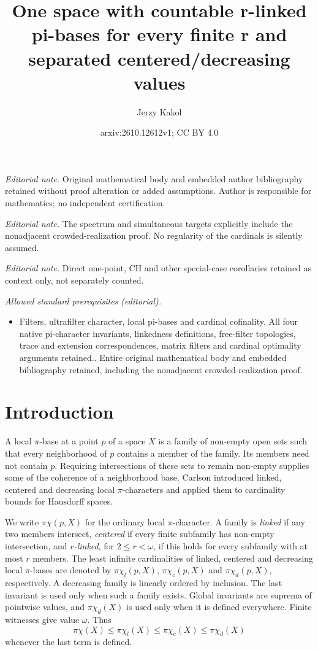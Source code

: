 \documentclass[10pt,a4paper]{amsart}
\title{One space with countable r-linked pi-bases for every finite r and separated centered/decreasing values}
\author{Jerzy Kakol}
\date{arxiv:2610.12612v1; CC BY 4.0}
\theoremstyle{definition}
\theoremstyle{remark}
\newcommand{\pc}{\pi\chi}
\newcommand{\pcl}{\pi\chi_l}
\newcommand{\pcc}{\pi\chi_c}
\newcommand{\pcd}{\pi\chi_d}
\begin{document}
\maketitle
\noindent\textit{Editorial note.} Original mathematical body and embedded author bibliography retained without proof alteration or added assumptions. Author is responsible for mathematics; no independent certification.\par\medskip
\noindent\textit{Editorial note.} The spectrum and simultaneous targets explicitly include the nonadjacent crowded-realization proof. No regularity of the cardinals is silently assumed.\par\medskip
\noindent\textit{Editorial note.} Direct one-point, CH and other special-case corollaries retained as context only, not separately counted.\par\medskip
\noindent\textit{Allowed standard prerequisites (editorial).}\begin{itemize}
\item Filters, ultrafilter character, local pi-bases and cardinal cofinality. All four native pi-character invariants, linkedness definitions, free-filter topologies, trace and extension correspondences, matrix filters and cardinal optimality arguments retained.. Entire original mathematical body and embedded bibliography retained, including the nonadjacent crowded-realization proof.
\end{itemize}\medskip
\section{Introduction}

A local $\pi$-base at a point $p$ of a space $X$ is a family of non-empty open sets such that every neighborhood of $p$ contains a member of the family. Its members need not contain $p$. Requiring intersections of these sets to remain non-empty supplies some of the coherence of a neighborhood base. Carlson \cite{Carlson} introduced linked, centered and decreasing local $\pi$-characters and applied them to cardinality bounds for Hausdorff spaces.

We write $\pc(p,X)$ for the ordinary local $\pi$-character. A family is \emph{linked} if any two members intersect, \emph{centered} if every finite subfamily has non-empty intersection, and \emph{$r$-linked}, for $2\leqslant r<\omega$, if this holds for every subfamily with at most $r$ members. The least infinite cardinalities of linked, centered and decreasing local $\pi$-bases are denoted by $\pcl(p,X)$, $\pcc(p,X)$ and $\pcd(p,X)$, respectively. A decreasing family is linearly ordered by inclusion. The last invariant is used only when such a family exists. Global invariants are suprema of pointwise values, and $\pcd(X)$ is used only when it is defined everywhere. Finite witnesses give value $\omega$. Thus
\[
\pc(X)\leqslant\pcl(X)\leqslant\pcc(X)\leqslant\pcd(X)
\]
whenever the last term is defined.
\end{document}
